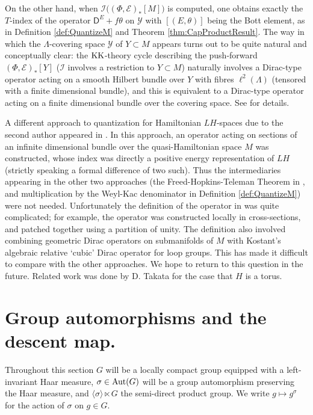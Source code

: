 \documentclass[11pt,reqno]{amsart}
\theoremstyle{definition}
\theoremstyle{remark}
\newcommand{\st}[1]{\mathsf{#1}}
\newcommand{\scr}[1]{\mathscr{#1}}
\def\E{\ensuremath{\mathcal{E}}}
\def\Y{\ensuremath{\mathcal{Y}}}
\def\Aut{\ensuremath{\textnormal{Aut}}}
\def\KK{\ensuremath{\textnormal{KK}}}
\begin{document}
On the other hand, when $\scr{I}\big((\Phi,\E)_\ast[M]\big)$ is computed, one obtains exactly the $T$-index of the operator $\st{D}^E+f\theta$ on $\Y$ with $[(E,\theta)]$ being the Bott element, as in Definition \ref{def:QuantizeM} and Theorem \ref{thm:CapProductResult}.  The way in which the $\Lambda$-covering space $\Y$ of $Y \subset M$ appears turns out to be quite natural and conceptually clear: the $\KK$-theory cycle describing the push-forward $(\Phi,\E)_\ast[Y]$ ($\scr{I}$ involves a restriction to $Y \subset M$) naturally involves a Dirac-type operator acting on a smooth Hilbert bundle over $Y$ with fibres $\ell^2(\Lambda)$ (tensored with a finite dimensional bundle), and this is equivalent to a Dirac-type operator acting on a finite dimensional bundle over the covering space.  See \cite{LoizidesGeomKHom} for details.

A different approach to quantization for Hamiltonian $LH$-spaces due to the second author appeared in \cite{SongDiracLoopGroup}.  In this approach, an operator acting on sections of an infinite dimensional bundle over the quasi-Hamiltonian space $M$ was constructed, whose index was directly a positive energy representation of $LH$ (strictly speaking a formal difference of two such).  Thus the intermediaries appearing in the other two approaches (the Freed-Hopkins-Teleman Theorem in \cite{MeinrenkenKHomology}, and multiplication by the Weyl-Kac denominator in Definition \ref{def:QuantizeM}) were not needed.  Unfortunately the definition of the operator in \cite{SongDiracLoopGroup} was quite complicated; for example, the operator was constructed locally in cross-sections, and patched together using a partition of unity.  The definition also involved combining geometric Dirac operators on submanifolds of $M$ with Kostant's algebraic relative `cubic' Dirac operator for loop groups.  This has made it difficult to compare with the other approaches.  We hope to return to this question in the future.  Related work was done by D. Takata \cite{Takata1,Takata2} for the case that $H$ is a torus.

\appendix

\section{Group automorphisms and the descent map.}\label{sec:GrpAut}
Throughout this section $G$ will be a locally compact group equipped with a left-invariant Haar measure, $\sigma \in \Aut(G)$ will be a group automorphism preserving the Haar measure, and $\langle \sigma \rangle \ltimes G$ the semi-direct product group.  We write $g \mapsto g^\sigma$ for the action of $\sigma$ on $g \in G$.
\end{document}
